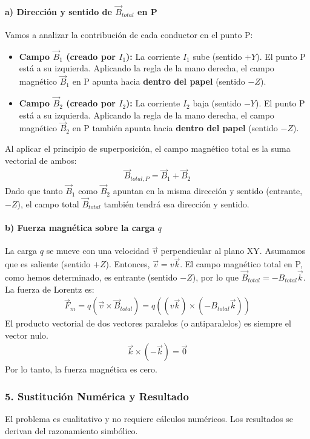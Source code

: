 \paragraph*{a) Dirección y sentido de $\vec{B}_{total}$ en P}
Vamos a analizar la contribución de cada conductor en el punto P:
\begin{itemize}
    \item \textbf{Campo $\vec{B}_1$ (creado por $I_1$):} La corriente $I_1$ sube (sentido $+Y$). El punto P está a su izquierda. Aplicando la regla de la mano derecha, el campo magnético $\vec{B}_1$ en P apunta hacia \textbf{dentro del papel} (sentido $-Z$).
    \item \textbf{Campo $\vec{B}_2$ (creado por $I_2$):} La corriente $I_2$ baja (sentido $-Y$). El punto P está a su izquierda. Aplicando la regla de la mano derecha, el campo magnético $\vec{B}_2$ en P también apunta hacia \textbf{dentro del papel} (sentido $-Z$).
\end{itemize}
Al aplicar el principio de superposición, el campo magnético total es la suma vectorial de ambos:
\begin{gather}
    \vec{B}_{total, P} = \vec{B}_1 + \vec{B}_2
\end{gather}
Dado que tanto $\vec{B}_1$ como $\vec{B}_2$ apuntan en la misma dirección y sentido (entrante, $-Z$), el campo total $\vec{B}_{total}$ también tendrá esa dirección y sentido.

\paragraph*{b) Fuerza magnética sobre la carga $q$}
La carga $q$ se mueve con una velocidad $\vec{v}$ perpendicular al plano XY. Asumamos que es saliente (sentido $+Z$). Entonces, $\vec{v} = v\vec{k}$. El campo magnético total en P, como hemos determinado, es entrante (sentido $-Z$), por lo que $\vec{B}_{total} = -B_{total}\vec{k}$.
La fuerza de Lorentz es:
\begin{gather}
    \vec{F}_m = q(\vec{v} \times \vec{B}_{total}) = q( (v\vec{k}) \times (-B_{total}\vec{k}) )
\end{gather}
El producto vectorial de dos vectores paralelos (o antiparalelos) es siempre el vector nulo.
\begin{gather}
    \vec{k} \times (-\vec{k}) = \vec{0}
\end{gather}
Por lo tanto, la fuerza magnética es cero.

\subsubsection*{5. Sustitución Numérica y Resultado}
El problema es cualitativo y no requiere cálculos numéricos. Los resultados se derivan del razonamiento simbólico.

